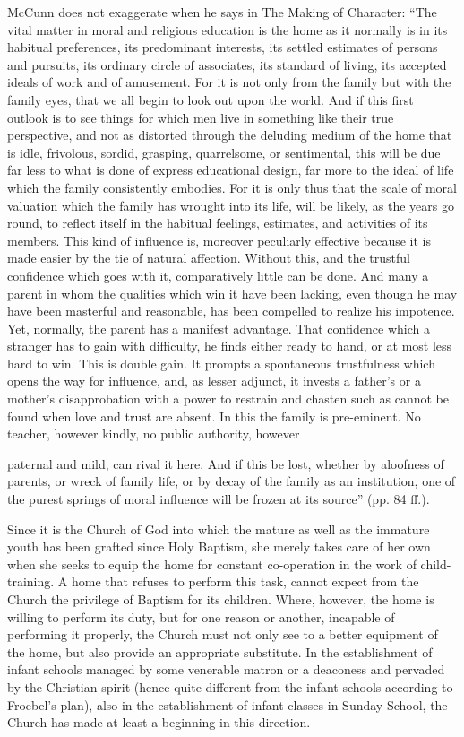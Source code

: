 McCunn does not exaggerate when he says in The Making of Character: “The vital matter in moral and religious education is the home as it normally is in its habitual preferences, its predominant interests, its settled estimates of persons and pursuits, its ordinary circle of associates, its standard of living, its accepted ideals of work and of amusement. For it is not only from the family but with the family eyes, that we all begin to look out upon the world. And if this first outlook is to see things for which men live in something like their true perspective, and not as distorted through the deluding medium of the home that is idle, frivolous, sordid, grasping, quarrelsome, or sentimental, this will be due far less to what is done of express educational design, far more to the ideal of life which the family consistently embodies. For it is only thus that the scale of moral valuation which the family has wrought into its life, will be likely, as the years go round, to reflect itself in the habitual feelings, estimates, and activities of its members. This kind of influence is, moreover peculiarly effective because it is made easier by the tie of natural affection. Without this, and the trustful confidence which goes with it, comparatively little can be done. And many a parent in whom the qualities which win it have been lacking, even though he may have been masterful and reasonable, has been compelled to realize his impotence. Yet, normally, the parent has a manifest advantage. That confidence which a stranger has to gain with difficulty, he finds either ready to hand, or at most less hard to win. This is double gain. It prompts a spontaneous trustfulness which opens the way for influence, and, as lesser adjunct, it invests a father’s or a mother’s disapprobation with a power to restrain and chasten such as cannot be found when love and trust are absent. In this the family is pre-eminent. No teacher, however kindly, no public authority, however

paternal and mild, can rival it here. And if this be lost, whether by aloofness of parents, or wreck of family life, or by decay of the family as an institution, one of the purest springs of moral influence will be frozen at its source” (pp. 84 ff.).

Since it is the Church of God into which the mature as well as the immature youth has been grafted since Holy Baptism, she merely takes care of her own when she seeks to equip the home for constant co-operation in the work of child-training. A home that refuses to perform this task, cannot expect from the Church the privilege of Baptism for its children. Where, however, the home is willing to perform its duty, but for one reason or another, incapable of performing it properly, the Church must not only see to a better equipment of the home, but also provide an appropriate substitute. In the establishment of infant schools managed by some venerable matron or a deaconess and pervaded by the Christian spirit (hence quite different from the infant schools according to Froebel’s plan), also in the establishment of infant classes in Sunday School, the Church has made at least a beginning in this direction.

